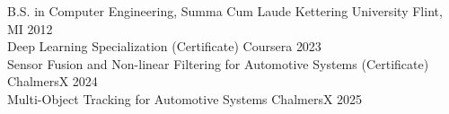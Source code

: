 \begin{samepage}
  \iflongform
    \nopagebreak
  \else
  \fi


  \begin{cventries}

    \cventryeducation
    {B.S. in Computer Engineering, Summa Cum Laude} %
    {Kettering University} %
    {Flint, MI} %
    {2012} %
    \iflongform
    \else
      \\\cventryeducation
      {Deep Learning Specialization (Certificate)} %
      {Coursera} %
      {} %
      {2023} %
      \\\cventryeducation
      {Sensor Fusion and Non-linear Filtering for Automotive Systems (Certificate)} %
      {ChalmersX} %
      {} %
      {2024} %
      \\\cventryeducation
      {Multi-Object Tracking for Automotive Systems} %
      {ChalmersX} %
      {} %
      {2025} %
    \fi

  \end{cventries}
\end{samepage}